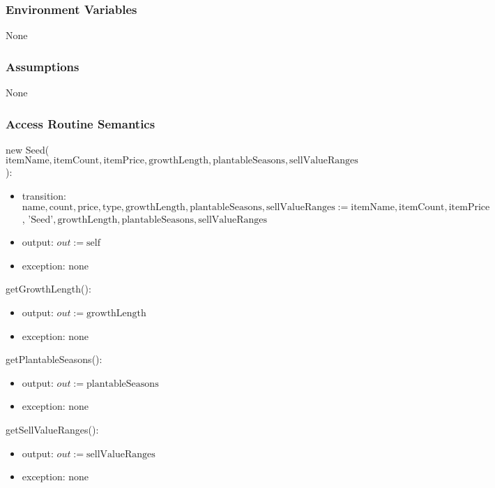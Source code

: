 \documentclass[12pt, titlepage]{article}
\begin{document}
\subsubsection{Environment Variables}

None
\subsubsection{Assumptions}

None

\subsubsection{Access Routine Semantics}

\noindent new Seed($\text{itemName}, \text{itemCount}, \text{itemPrice}, \text{growthLength}, \text{plantableSeasons}, \text{sellValueRanges}$):
\begin{itemize}
\item transition: $\text{name}, \text{count}, \text{price}, \text{type}, \text{growthLength}, \text{plantableSeasons}, \text{sellValueRanges}:= \text{itemName}, \text{itemCount}, \text{itemPrice}$, $\text{'Seed'} , \text{growthLength}, \text{plantableSeasons}, \text{sellValueRanges}$
\item output: $out := \mbox{self}$
\item exception: none
\end{itemize}


\noindent getGrowthLength():
\begin{itemize}
\item output: $out := \text{growthLength}$
\item exception: none
\end{itemize}

\noindent getPlantableSeasons():
\begin{itemize}
\item output: $out := \text{plantableSeasons}$
\item exception: none
\end{itemize}

\noindent getSellValueRanges():
\begin{itemize}
\item output: $out := \text{sellValueRanges}$
\item exception: none
\end{itemize}

  
\medskip
\newpage

\end{document}
